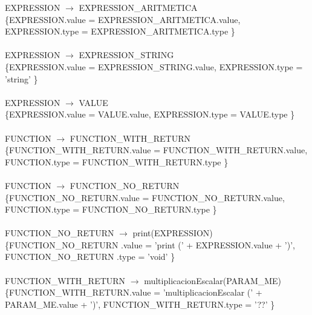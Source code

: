 \documentclass[10pt,a4paper]{article}
\begin{document}
{{{EXPRESSION $\rightarrow$ EXPRESSION\_ARITMETICA \\   

\{EXPRESSION.value =  EXPRESSION\_ARITMETICA.value, EXPRESSION.type = EXPRESSION\_ARITMETICA.type  \}  \\ \\


EXPRESSION $\rightarrow$ EXPRESSION\_STRING   \\

\{EXPRESSION.value =  EXPRESSION\_STRING.value, EXPRESSION.type = 'string'  \}  \\ \\


EXPRESSION $\rightarrow$ VALUE \\

\{EXPRESSION.value =  VALUE.value, EXPRESSION.type = VALUE.type  \}  \\ \\



FUNCTION $\rightarrow$ FUNCTION\_WITH\_RETURN \\

\{FUNCTION\_WITH\_RETURN.value =  FUNCTION\_WITH\_RETURN.value, FUNCTION.type = FUNCTION\_WITH\_RETURN.type  \}  \\ \\


FUNCTION $\rightarrow$ FUNCTION\_NO\_RETURN \\

\{FUNCTION\_NO\_RETURN.value =  FUNCTION\_NO\_RETURN.value, FUNCTION.type = FUNCTION\_NO\_RETURN.type  \}  \\ \\



FUNCTION\_NO\_RETURN $\rightarrow$ print(EXPRESSION) \\   

\{FUNCTION\_NO\_RETURN .value =  'print (' + EXPRESSION.value + ')', FUNCTION\_NO\_RETURN .type = 'void'  \}  \\ \\


FUNCTION\_WITH\_RETURN $\rightarrow$ multiplicacionEscalar(PARAM\_ME) \\   

\{FUNCTION\_WITH\_RETURN.value =  'multiplicacionEscalar (' + PARAM\_ME.value + ')', FUNCTION\_WITH\_RETURN.type = '??'  \}  \\ \\


}}}
\end{document}

